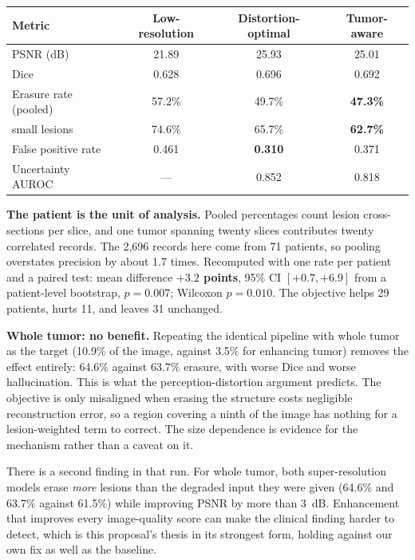 \documentclass[11pt,a4paper]{article}
\begin{document}
\begin{center}
\renewcommand{\arraystretch}{1.15}
\begin{tabular}{@{}lccc@{}}
\toprule
\textbf{Metric} & \textbf{Low-resolution} & \textbf{Distortion-optimal} & \textbf{Tumor-aware} \\
\midrule
PSNR (dB) & 21.89 & 25.93 & 25.01 \\
Dice & 0.628 & 0.696 & 0.692 \\
Erasure rate (pooled) & 57.2\% & 49.7\% & \textbf{47.3\%} \\
\quad small lesions & 74.6\% & 65.7\% & \textbf{62.7\%} \\
False positive rate & 0.461 & \textbf{0.310} & 0.371 \\
Uncertainty AUROC & --- & 0.852 & 0.818 \\
\bottomrule
\end{tabular}
\end{center}

\textbf{The patient is the unit of analysis.} Pooled percentages count lesion cross-sections per slice, and one tumor spanning twenty slices contributes twenty correlated records. The 2,696 records here come from 71 patients, so pooling overstates precision by about 1.7 times. Recomputed with one rate per patient and a paired test: mean difference \textbf{$+3.2$ points}, 95\% CI $[+0.7, +6.9]$ from a patient-level bootstrap, $p = 0.007$; Wilcoxon $p = 0.010$. The objective helps 29 patients, hurts 11, and leaves 31 unchanged.

\textbf{Whole tumor: no benefit.} Repeating the identical pipeline with whole tumor as the target (10.9\% of the image, against 3.5\% for enhancing tumor) removes the effect entirely: 64.6\% against 63.7\% erasure, with worse Dice and worse hallucination. This is what the perception-distortion argument predicts. The objective is only misaligned when erasing the structure costs negligible reconstruction error, so a region covering a ninth of the image has nothing for a lesion-weighted term to correct. The size dependence is evidence for the mechanism rather than a caveat on it.

There is a second finding in that run. For whole tumor, both super-resolution models erase \textit{more} lesions than the degraded input they were given (64.6\% and 63.7\% against 61.5\%) while improving PSNR by more than 3~dB. Enhancement that improves every image-quality score can make the clinical finding harder to detect, which is this proposal's thesis in its strongest form, holding against our own fix as well as the baseline.
\end{document}
